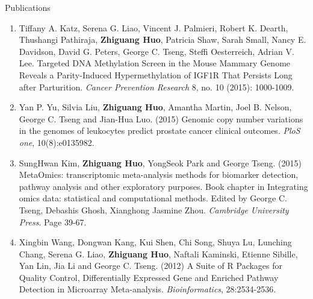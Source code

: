 \documentclass{resume} %
\begin{document}
\begin{rSection}{Publications}
\begin{enumerate}[noitemsep,topsep=0pt,resume]
    \item Tiffany A. Katz, Serena G. Liao, Vincent J. Palmieri, Robert K. Dearth, Thushangi Pathiraja, {\bf Zhiguang Huo}, Patricia Shaw, Sarah Small, Nancy E. Davidson, David G. Peters, George C. Tseng, Steffi Oesterreich, Adrian V. Lee. Targeted DNA Methylation Screen in the Mouse Mammary Genome Reveals a Parity-Induced Hypermethylation of IGF1R That Persists Long after Parturition. \emph{Cancer Prevention Research} 8, no. 10 (2015): 1000-1009.

    \item Yan P. Yu, Silvia Liu, {\bf Zhiguang Huo}, Amantha Martin, Joel B. Nelson, George C. Tseng and Jian-Hua Luo. (2015) Genomic copy number variations in the genomes of leukocytes predict prostate cancer clinical outcomes. \emph{PloS one}, 10(8):e0135982.

\item SungHwan Kim,  {\bf Zhiguang Huo}, YongSeok Park and George Tseng.  (2015) MetaOmics: transcriptomic meta-analysis methods for biomarker detection, pathway analysis and other exploratory purposes. Book chapter in Integrating omics data: statistical and computational methods. Edited by George C. Tseng, Debashis Ghosh, Xianghong Jasmine Zhou. \emph{Cambridge University Press}. Page 39-67.

    \item Xingbin Wang, Dongwan Kang, Kui Shen, Chi Song, Shuya Lu, Lunching Chang, Serena G. Liao, {\bf Zhiguang Huo}, Naftali Kaminski, Etienne Sibille, Yan Lin, Jia Li and George C. Tseng. (2012) A Suite of R Packages for Quality Control, Differentially Expressed Gene and Enriched Pathway Detection in Microarray Meta-analysis. \emph{Bioinformatics}, 28:2534-2536.

\end{enumerate}


\end{rSection}
\end{document}
